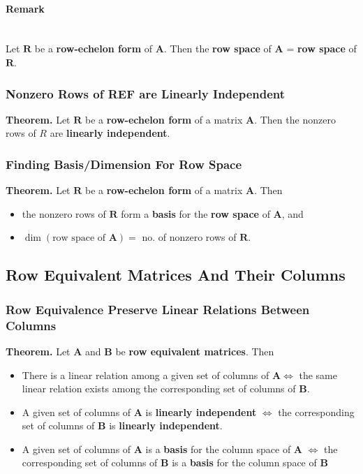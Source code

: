 \documentclass[../ma2001_notes.tex]{subfiles}
\begin{document}
\paragraph{Remark}\,\\
Let \(\bm{R}\) be a \textbf{row-echelon form} of \(\bm{A}\). Then the \textbf{row space} of \(\bm{A}\) = \textbf{row space} of \(\bm{R}\).

\subsubsection{Nonzero Rows of REF are Linearly Independent}
\textbf{Theorem.} Let \(\bm{R}\) be a \textbf{row-echelon form} of a matrix \(\bm{A}\). Then the nonzero rows of \(R\) are \textbf{linearly independent}.

\subsubsection{Finding Basis/Dimension For Row Space}
\textbf{Theorem.} Let \(\bm{R}\) be a \textbf{row-echelon form} of a matrix \(\bm{A}\). Then
\begin{itemize}
	\item the nonzero rows of \(\bm{R}\) form a \textbf{basis} for the \textbf{row space} of \(\bm{A}\), and
	\item\(\dim(\text{row space of }\bm{A})=\) no. of nonzero rows of \(\bm{R}\).
\end{itemize}


\subsection{Row Equivalent Matrices And Their Columns}
\subsubsection{Row Equivalence Preserve Linear Relations Between Columns}
\textbf{Theorem.} Let \(\bm{A}\) and \(\bm{B}\) be \textbf{row equivalent matrices}. Then
\begin{itemize}
	\item There is a linear relation among a given set of columns of \(\bm{A}\Leftrightarrow\) the same linear relation exists among the corresponding set of columns of \(\bm{B}\).
	\item A given set of columns of \(\bm{A}\) is \textbf{linearly independent} \(\Leftrightarrow\) the corresponding set of columns of \(\bm{B}\) is \textbf{linearly independent}.
	\item A given set of columns of \(\bm{A}\) is a \textbf{basis} for the column space of \(\bm{A}\) \(\Leftrightarrow\) the corresponding set of columns of \(\bm{B}\) is a \textbf{basis} for the column space of \(\bm{B}\)
\end{itemize}
\end{document}
